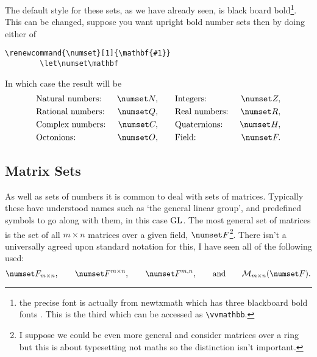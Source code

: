 \documentclass[fleqn, a4paper, openany]{memoir}
\newcommand{\package}[1]{{\textsf{\footnotesize #1}}}  %
\begin{document}
    The default style for these sets, as we have already seen, is black board bold\footnote{the precise font is actually from \package{newtxmath} which has three blackboard bold fonts \cite{newtx}. This is the third which can be accessed as \texttt{\textbackslash{}vvmathbb}.}.
    This can be changed, suppose you want upright bold number sets then by doing either of
    \begin{Verbatim}[gobble=2]
        \renewcommand{\numset}[1]{\mathbf{#1}}
        \let\numset\mathbf
    \end{Verbatim}
    In which case the result will be
    \let\oldnumset\numset
    \let\numset\mathbf
    \begin{align}
        &\text{Natural numbers:}~&\naturals,\qquad &\text{Integers:}~&\integers,\\
        &\text{Rational numbers:}~&\rationals,\qquad &\text{Real numbers:}~&\reals,\\
        &\text{Complex numbers:}~&\complex,\qquad &\text{Quaternions:}~&\quaternions,\\
        &\text{Octonions:}~&\octonions,\qquad &\text{Field:}~&\field.
    \end{align}
    \let\numset\oldnumset
    
    \subsection{Matrix Sets}
    As well as sets of numbers it is common to deal with sets of matrices.
    Typically these have understood names such as `the general linear group', and predefined symbols to go along with them, in this case \(\operatorname{GL}\).
    The most general set of matrices is the set of all \(m\times n\) matrices over a given field, \(\field\)\footnote{I suppose we could be even more general and consider matrices over a ring but this is about typesetting not maths so the distinction isn't important.}.
    There isn't a universally agreed upon standard notation for this, I have seen all of the following used:
    \begin{equation}
        \field_{m\times n}, \qquad \field^{m\times n}, \qquad \field^{m, n}, \qquad\text{and}\qquad \matrices[m]{n}{\field}.
    \end{equation}
    
\end{document}
